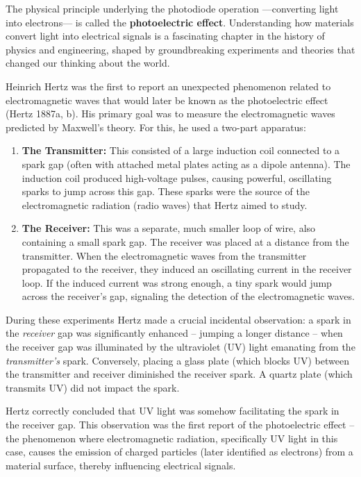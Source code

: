 \documentclass[
  letterpaper,
]{book}
\begin{document}
The physical principle underlying the photodiode operation ---converting
light into electrons--- is called the \textbf{photoelectric effect}.
Understanding how materials convert light into electrical signals is a
fascinating chapter in the history of physics and engineering, shaped by
groundbreaking experiments and theories that changed our thinking about
the world.

Heinrich Hertz was the first to report an unexpected phenomenon related
to electromagnetic waves that would later be known as the photoelectric
effect (Hertz 1887a, b). His primary goal was to measure the
electromagnetic waves predicted by Maxwell's theory. For this, he used a
two-part apparatus:

\begin{enumerate}
\def\labelenumi{\arabic{enumi}.}
\item
  \textbf{The Transmitter:} This consisted of a large induction coil
  connected to a spark gap (often with attached metal plates acting as a
  dipole antenna). The induction coil produced high-voltage pulses,
  causing powerful, oscillating sparks to jump across this gap. These
  sparks were the source of the electromagnetic radiation (radio waves)
  that Hertz aimed to study.
\item
  \textbf{The Receiver:} This was a separate, much smaller loop of wire,
  also containing a small spark gap. The receiver was placed at a
  distance from the transmitter. When the electromagnetic waves from the
  transmitter propagated to the receiver, they induced an oscillating
  current in the receiver loop. If the induced current was strong
  enough, a tiny spark would jump across the receiver's gap, signaling
  the detection of the electromagnetic waves.
\end{enumerate}

During these experiments Hertz made a crucial incidental observation: a
spark in the \emph{receiver} gap was significantly enhanced -- jumping a
longer distance -- when the receiver gap was illuminated by the
ultraviolet (UV) light emanating from the \emph{transmitter's} spark.
Conversely, placing a glass plate (which blocks UV) between the
transmitter and receiver diminished the receiver spark. A quartz plate
(which transmits UV) did not impact the spark.

Hertz correctly concluded that UV light was somehow facilitating the
spark in the receiver gap. This observation was the first report of the
photoelectric effect -- the phenomenon where electromagnetic radiation,
specifically UV light in this case, causes the emission of charged
particles (later identified as electrons) from a material surface,
thereby influencing electrical signals.
\end{document}
